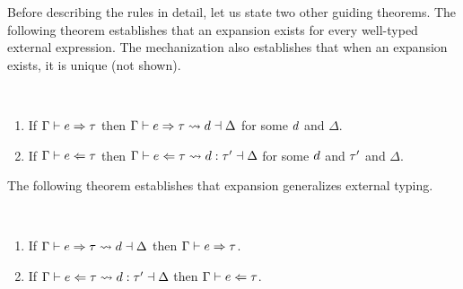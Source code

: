 Before describing the rules in detail, let us state two other guiding theorems.
The following theorem establishes that an expansion exists for every well-typed external expression.
The mechanization also establishes that when an expansion exists, it is unique (not shown).
 \begin{thm}[Expandability] \label{thm:expandability}~
  \begin{enumerate}[nolistsep]
    \item
      If $\Gamma \vdash e \Rightarrow \tau$
      then $\Gamma \vdash e \Rightarrow \tau \leadsto d \dashv \Delta$
      for some $d$ and $\Delta$.
    \item
      If $\Gamma \vdash e \Leftarrow \tau$
      then $\Gamma \vdash e \Leftarrow \tau \leadsto d : \tau' \dashv \Delta$
      for some $d$ and $\tau'$ and $\Delta$.
  \end{enumerate}
\end{thm}
The following theorem establishes that expansion generalizes external typing.
\begin{thm} \label{thm:expansion-generality}~
  \begin{enumerate}[nolistsep]
    \item
      If $\Gamma \vdash e \Rightarrow \tau \leadsto d \dashv \Delta$
      then $\Gamma \vdash e \Rightarrow \tau$.
    \item
      If $\Gamma \vdash e \Leftarrow \tau \leadsto d : \tau' \dashv \Delta$
      then $\Gamma \vdash e \Leftarrow \tau$.
  \end{enumerate}
\end{thm}

